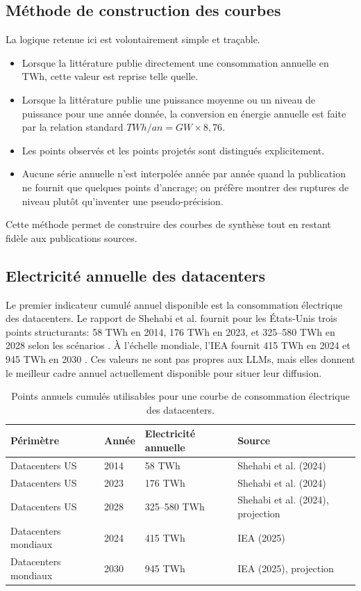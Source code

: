 \documentclass[11pt,a4paper]{article}
\begin{document}
\subsection{Méthode de construction des courbes}
La logique retenue ici est volontairement simple et traçable.

\begin{itemize}
\item Lorsque la littérature publie directement une consommation annuelle en TWh, cette valeur est reprise telle quelle.
\item Lorsque la littérature publie une puissance moyenne ou un niveau de puissance pour une année donnée, la conversion en énergie annuelle est faite par la relation standard $TWh/an = GW \times 8{,}76$.
\item Les points observés et les points projetés sont distingués explicitement.
\item Aucune série annuelle n'est interpolée année par année quand la publication ne fournit que quelques points d'ancrage; on préfère montrer des ruptures de niveau plutôt qu'inventer une pseudo-précision.
\end{itemize}

Cette méthode permet de construire des courbes de synthèse tout en restant fidèle aux publications sources.

\subsection{Electricité annuelle des datacenters}
Le premier indicateur cumulé annuel disponible est la consommation électrique des datacenters. Le rapport de Shehabi et al. fournit pour les États-Unis trois points structurants: 58 TWh en 2014, 176 TWh en 2023, et 325--580 TWh en 2028 selon les scénarios \cite{shehabi2024report}. À l'échelle mondiale, l'IEA fournit 415 TWh en 2024 et 945 TWh en 2030 \cite{iea2025}. Ces valeurs ne sont pas propres aux LLMs, mais elles donnent le meilleur cadre annuel actuellement disponible pour situer leur diffusion.

\begin{table}[htbp]
\centering
\small
\begin{tabularx}{\textwidth}{|L{3.2cm}|L{2.2cm}|L{2.8cm}|Y|}
\hline
Périmètre & Année & Electricité annuelle & Source \\
\hline
Datacenters US & 2014 & 58 TWh & Shehabi et al. (2024) \cite{shehabi2024report} \\
\hline
Datacenters US & 2023 & 176 TWh & Shehabi et al. (2024) \cite{shehabi2024report} \\
\hline
Datacenters US & 2028 & 325--580 TWh & Shehabi et al. (2024), projection \cite{shehabi2024report} \\
\hline
Datacenters mondiaux & 2024 & 415 TWh & IEA (2025) \cite{iea2025} \\
\hline
Datacenters mondiaux & 2030 & 945 TWh & IEA (2025), projection \cite{iea2025} \\
\hline
\end{tabularx}
\caption{Points annuels cumulés utilisables pour une courbe de consommation électrique des datacenters.}
\label{tab:annual-datacenters}
\end{table}
\end{document}
